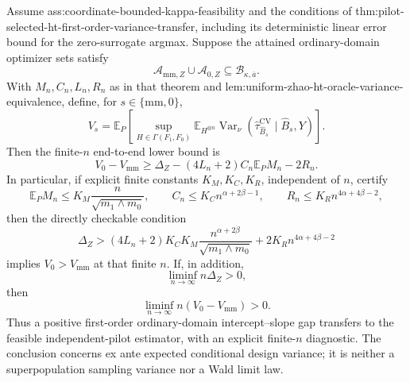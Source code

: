 Assume ass:coordinate-bounded-kappa-feasibility and the conditions of thm:pilot-selected-ht-first-order-variance-transfer, including its deterministic linear error bound for the zero-surrogate argmax.  Suppose the attained ordinary-domain optimizer sets satisfy
\[
\mathcal A_{\mathrm{mm},Z}\cup\mathcal A_{0,Z}
\subseteq\mathcal B_{\kappa,\overline a}.
\]
With \(M_n,C_n,L_n,R_n\) as in that theorem and lem:uniform-zhao-ht-oracle-variance-equivalence, define, for \(s\in\{\mathrm{mm},0\}\),
\[
V_s=
\mathbb E_P\left[
\sup_{H\in\Gamma(F_1,F_0)}
\mathbb E_{H^{\otimes n}}
\operatorname{Var}_\nu
(\widehat\tau_{\widehat B_s}^{\mathrm{CV}}\mid\widehat B_s,Y)
\right].
\]
Then the finite-\(n\) end-to-end lower bound is
\[
V_0-V_{\mathrm{mm}}
\ge\Delta_Z-(4L_n+2)C_n\mathbb E_PM_n-2R_n.
\]
In particular, if explicit finite constants \(K_M,K_C,K_R\), independent of \(n\), certify
\[
\mathbb E_PM_n\le K_M\frac{n}{\sqrt{m_1\wedge m_0}},
\qquad
C_n\le K_Cn^{\alpha+2\beta-1},
\qquad
R_n\le K_Rn^{4\alpha+4\beta-2},
\]
then the directly checkable condition
\[
\Delta_Z>
(4L_n+2)K_CK_M
\frac{n^{\alpha+2\beta}}{\sqrt{m_1\wedge m_0}}
+2K_Rn^{4\alpha+4\beta-2}
\]
implies \(V_0>V_{\mathrm{mm}}\) at that finite \(n\).  If, in addition,
\[
\liminf_{n\to\infty}n\Delta_Z>0,
\]
then
\[
\liminf_{n\to\infty}n(V_0-V_{\mathrm{mm}})>0.
\]
Thus a positive first-order ordinary-domain intercept--slope gap transfers to the feasible independent-pilot estimator, with an explicit finite-\(n\) diagnostic.  The conclusion concerns ex ante expected conditional design variance; it is neither a superpopulation sampling variance nor a Wald limit law.